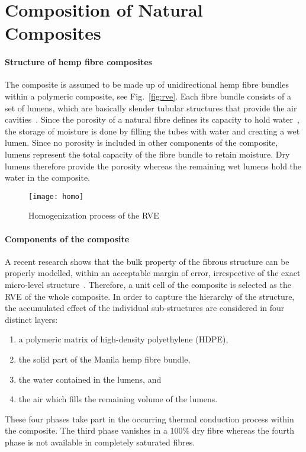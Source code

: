 \red
\section{Composition of Natural Composites}
	\paragraph{Structure of hemp fibre composites} The composite is assumed to be made up of unidirectional hemp fibre bundles within a polymeric composite, see Fig.~\ref{fig:rve}. Each fibre bundle consists of a set of lumens, which are basically slender tubular structures that provide the air cavities~\autocite{Wang.2016}. Since the porosity of a natural fibre defines its capacity to hold water~\autocite{Rakovsky.2014}, the storage of moisture is done by filling the tubes with water and creating a wet lumen. Since no porosity is included in other components of the composite, lumens represent the total capacity of the fibre bundle to retain moisture. Dry lumens therefore provide the porosity whereas the remaining wet lumens hold the water in the composite.

\begin{figure}[!h]
\centering
\texttt{[image: homo]}
\caption{Homogenization process of the RVE}\label{fig:homo}
\end{figure}

	\paragraph{Components of the composite} A recent research shows that the bulk property of the fibrous structure can be properly modelled, within an acceptable margin of error, irrespective of the exact micro-level structure~\autocite{Liu.2011}. Therefore, a unit cell of the composite is selected as the RVE of the whole composite. In order to capture the hierarchy of the structure, the accumulated effect of the individual sub-structures are considered in four distinct layers: 
	\begin{enumerate}
	\item a polymeric matrix of high-density polyethylene (HDPE),
	\item the solid part of the Manila hemp fibre bundle,
	\item the water contained in the lumens, and
	\item the air which fills the remaining volume of the lumens.
	\end{enumerate}
	These four phases take part in the occurring thermal conduction process within the composite. The third phase vanishes in a 100\% dry fibre whereas the fourth phase is not available in completely saturated fibres.
	
